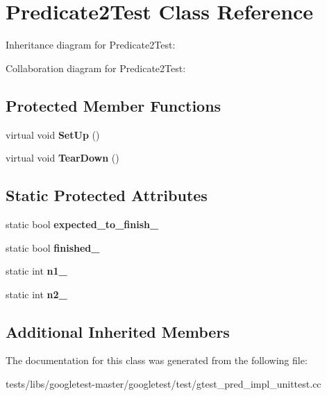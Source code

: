 \hypertarget{classPredicate2Test}{}\section{Predicate2\+Test Class Reference}
\label{classPredicate2Test}


Inheritance diagram for Predicate2\+Test\+:


Collaboration diagram for Predicate2\+Test\+:
\subsection*{Protected Member Functions}
\begin{DoxyCompactItemize}
\item 
\mbox{\label{classPredicate2Test_a9778563daf4846327d32061c1a8ccba0}} 
virtual void {\bfseries Set\+Up} ()
\item 
\mbox{\label{classPredicate2Test_a7379f8f7772af6b4c76edcc90b6aaaeb}} 
virtual void {\bfseries Tear\+Down} ()
\end{DoxyCompactItemize}
\subsection*{Static Protected Attributes}
\begin{DoxyCompactItemize}
\item 
\mbox{\label{classPredicate2Test_a56cf1f0f556addd9a62e0644dc1a86fc}} 
static bool {\bfseries expected\+\_\+to\+\_\+finish\+\_\+}
\item 
\mbox{\label{classPredicate2Test_a30f4ef76d3004253078e767e5c653b85}} 
static bool {\bfseries finished\+\_\+}
\item 
\mbox{\label{classPredicate2Test_ac002d8e279b24e75906fd19973fc2170}} 
static int {\bfseries n1\+\_\+}
\item 
\mbox{\label{classPredicate2Test_a9dbe5173570b9b911af2df889c287027}} 
static int {\bfseries n2\+\_\+}
\end{DoxyCompactItemize}
\subsection*{Additional Inherited Members}


The documentation for this class was generated from the following file\+:\begin{DoxyCompactItemize}
\item 
tests/libs/googletest-\/master/googletest/test/gtest\+\_\+pred\+\_\+impl\+\_\+unittest.\+cc\end{DoxyCompactItemize}
